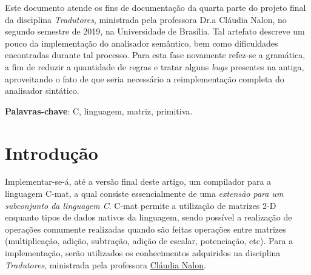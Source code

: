 \documentclass[
	article,			%
	11pt,				%
	oneside,			%
	a4paper,			%
	english,			%
	brazil,				%
	sumario=tradicional
	]{abntex2}
\renewcommand{\it}[1]{\textit{#1}}
\begin{document}

\frenchspacing 


%
%

\maketitle





\begin{resumoumacoluna}
 Este documento atende os fins de documentação da quarta
 parte do projeto final da disciplina \textit{Tradutores},
 ministrada pela professora Dr.a Cláudia Nalon, no segundo semestre de 2019, na Universidade de Brasília. Tal artefato descreve um pouco da implementação do analisador semântico, bem como dificuldades encontradas durante tal processo. Para esta fase novamente refez-se a gramática, a fim de reduzir a quantidade de regras e tratar alguns \it{bugs} presentes na antiga, aproveitando o fato de que seria necessário a reimplementação completa do analisador sintático.
 \vspace{\onelineskip}
 
 \noindent
 \textbf{Palavras-chave}: C, linguagem, matriz, primitiva.
\end{resumoumacoluna}




\newcommand{\terminal}[1]{ \bnfpn{\textbf{#1}} }

\newcommand{\production}[1]{\bnfpn{\textit{#1}}}
\newcommand{\IT}[1]{\textit{#1}}
\newcommand{\BF}[1]{\textbf{#1}}


\section{Introdução}
Implementar-se-á, até a versão final deste artigo, um compilador para a linguagem C-mat, a qual consiste essencialmente de uma \it{extensão para um subconjunto da linguagem C}. C-mat permite a utilização de matrizes 2-D enquanto tipos de dados nativos da linguagem, sendo possível a realização de operações comumente realizadas quando são feitas operações entre matrizes (multiplicação, adição, subtração, adição de escalar, potenciação, etc). Para a implementação, serão utilizados os conhecimentos adquiridos na disciplina \textit{Tradutores}, ministrada pela professora \hyperref{http://lattes.cnpq.br/7793795625581127}{}{}{Cláudia Nalon}.
\end{document}
